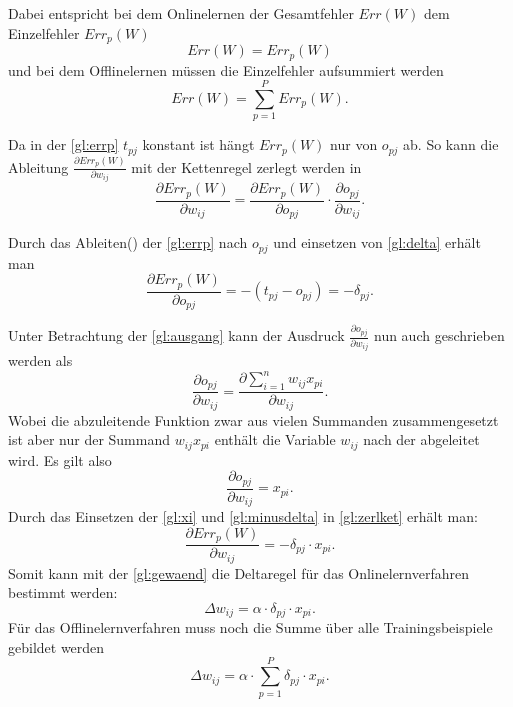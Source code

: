 Dabei entspricht bei dem Onlinelernen der Gesamtfehler $Err(W)$ dem Einzelfehler $Err_p(W)$
\begin{equation}
Err(W)=Err_p(W) 
\end{equation}
und bei dem Offlinelernen müssen die Einzelfehler aufsummiert werden
\begin{equation}
Err(W)= \sum^P_{p=1} Err_p(W). 
\end{equation}

Da in der \autoref{gl:errp} $t_{pj}$ konstant ist hängt $Err_p(W)$ nur von $o_{pj}$ ab. So kann die Ableitung $\frac{\partial Err_p(W)}{\partial w_{ij}}$ mit der Kettenregel zerlegt werden in
\begin{equation}
\frac{\partial Err_p(W)}{\partial w_{ij}}= \frac{\partial Err_p(W)}{\partial o_{pj}} \cdot \frac{\partial o_{pj}}{\partial w_{ij}}.
\label{gl:zerlket}
\end{equation}

Durch das Ableiten() der \autoref{gl:errp} nach $o_{pj}$ und einsetzen von \autoref{gl:delta} erhält man
\begin{equation}
\frac{\partial Err_p(W)}{\partial o_{pj}} = -(t_{pj}-o_{pj}) = - \delta_{pj} .
\label{gl:minusdelta}
\end{equation}

Unter Betrachtung der \autoref{gl:ausgang} kann der Ausdruck $ \frac{\partial o_{pj}}{\partial w_{ij}}$ nun auch geschrieben werden als 
\begin{equation}
\frac{\partial o_{pj}}{\partial w_{ij}} = \frac{\partial \sum\limits_{i=1}^n w_{ij} x_{pi}}{\partial w_{ij}} .
\label{gl:vor_xi}
\end{equation}
Wobei die abzuleitende Funktion zwar aus vielen Summanden zusammengesetzt ist aber nur der Summand $w_{ij} x_{pi}$ enthält die Variable $w_{ij}$ nach der abgeleitet wird. Es gilt also
\begin{equation}
\frac{\partial o_{pj}}{\partial w_{ij}} = x_{pi}.
\label{gl:xi}
\end{equation}
Durch das Einsetzen der \autoref{gl:xi} und \autoref{gl:minusdelta} in \autoref{gl:zerlket} erhält man:
\begin{equation}
\frac{\partial Err_p(W)}{\partial w_{ij}}= - \delta_{pj} \cdot x_{pi}.
\label{gl:ze}
\end{equation}
Somit kann mit der \autoref{gl:gewaend} die Deltaregel für das Onlinelernverfahren bestimmt werden:
\begin{equation}
\Delta w_{ij} = \alpha \cdot \delta_{pj} \cdot x_{pi} .
\label{gl:fertig_delta}
\end{equation}
Für das Offlinelernverfahren muss noch die Summe über alle Trainingsbeispiele gebildet werden
\begin{equation}
\Delta w_{ij} = \alpha \cdot \sum^P_{p=1} \delta_{pj} \cdot x_{pi} .
\end{equation}



